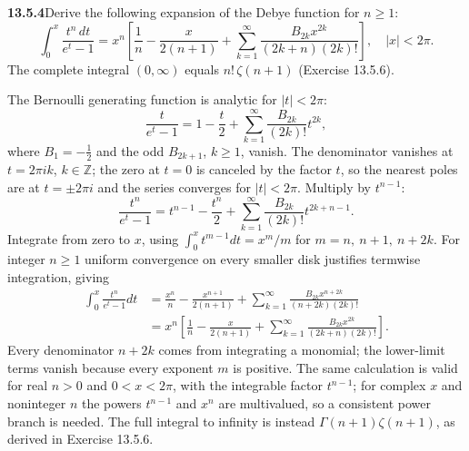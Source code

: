 \par\bigskip
\noindent\textbf{13.5.4}\quad Derive the following expansion of the Debye
function for $n\ge1$:
\[
\int_{0}^{x}\frac{t^{n}\,dt}{e^{t}-1}
=x^{n}\left[\frac{1}{n}-\frac{x}{2(n+1)}
+\sum_{k=1}^{\infty}\frac{B_{2k}x^{2k}}{(2k+n)(2k)!}\right],
\quad|x|<2\pi.
\]
The complete integral $(0,\infty)$ equals $n!\,\zeta(n+1)$
(Exercise 13.5.6).
\par\smallskip
{}
\solution
The Bernoulli generating function is analytic for $|t|<2\pi$:
\[
\frac{t}{e^t-1}=1-\frac t2+
\sum_{k=1}^{\infty}\frac{B_{2k}}{(2k)!}t^{2k},
\]
where $B_1=-\frac12$ and the odd $B_{2k+1}$, $k\ge1$, vanish.
The denominator vanishes at $t=2\pi ik$, $k\in\mathbb Z$; the zero at
$t=0$ is canceled by the factor $t$, so the nearest poles are at
$t=\pm2\pi i$ and the series converges for $|t|<2\pi$.
Multiply by $t^{n-1}$:
\[
\frac{t^n}{e^t-1}=t^{n-1}-\frac{t^n}2
+\sum_{k=1}^{\infty}\frac{B_{2k}}{(2k)!}t^{2k+n-1}.
\]
Integrate from zero to $x$, using
$\int_0^xt^{m-1}dt=x^m/m$ for $m=n,\ n+1,\ n+2k$.
For integer $n\ge1$ uniform convergence on every smaller disk
justifies termwise integration, giving
\begin{align*}
\int_0^x\frac{t^n}{e^t-1}dt
&=\frac{x^n}{n}-\frac{x^{n+1}}{2(n+1)}
+\sum_{k=1}^{\infty}
\frac{B_{2k}x^{n+2k}}{(n+2k)(2k)!}\\
&=\boxed{x^n\left[\frac1n-\frac{x}{2(n+1)}+
\sum_{k=1}^{\infty}\frac{B_{2k}x^{2k}}{(2k+n)(2k)!}\right]}.
\end{align*}
Every denominator $n+2k$ comes from integrating a monomial;
the lower-limit terms vanish because every exponent $m$ is
positive.  The same calculation is valid
for real $n>0$ and $0<x<2\pi$, with the integrable factor
$t^{n-1}$; for complex $x$ and noninteger $n$ the powers $t^{n-1}$
and $x^n$ are multivalued, so a consistent power branch is needed.
The full integral to infinity is instead
$\Gamma(n+1)\zeta(n+1)$, as derived in Exercise 13.5.6.


